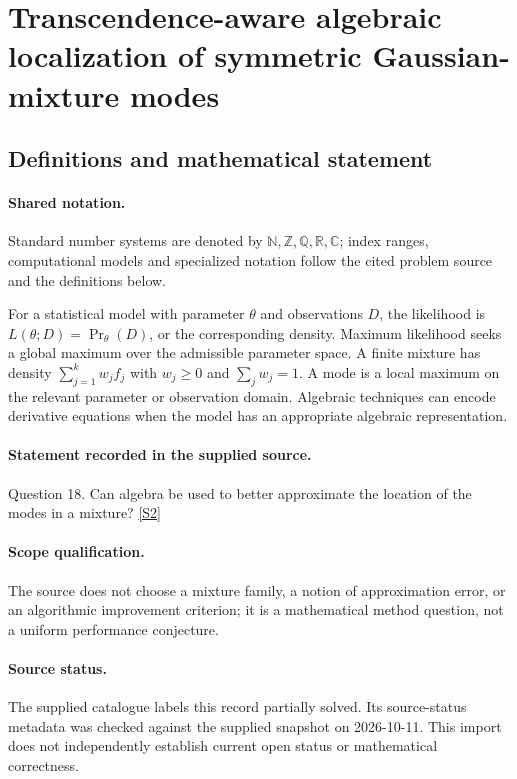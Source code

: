 \documentclass[11pt]{article}
\newcommand{\sref}[2]{\hyperlink{source:#1:#2}{[S#2]}}
\begin{document}
\section{Transcendence-aware algebraic localization of symmetric Gaussian-mixture modes}\label{statement}

\subsection{Definitions and mathematical statement}

\paragraph{Shared notation.}Standard number systems are denoted by $\mathbb N,\mathbb Z,\mathbb Q,\mathbb R,\mathbb C$; index ranges, computational models and specialized notation follow the cited problem source and the definitions below.


For a statistical model with parameter $\theta$ and observations $D$, the likelihood is $L(\theta;D)=\Pr_\theta(D)$, or the corresponding density. Maximum likelihood seeks a global maximum over the admissible parameter space. A finite mixture has density $\sum_{j=1}^k w_j f_j$ with $w_j\ge0$ and $\sum_j w_j=1$. A mode is a local maximum on the relevant parameter or observation domain. Algebraic techniques can encode derivative equations when the model has an appropriate algebraic representation.
\paragraph{Statement recorded in the supplied source.}
Question 18. Can algebra be used to better approximate the location of the modes in a mixture? \sref{statement}{2}
\paragraph{Scope qualification.}
The source does not choose a mixture family, a notion of approximation error, or an algorithmic improvement criterion; it is a mathematical method question, not a uniform performance conjecture.
\paragraph{Source status.}
The supplied catalogue labels this record partially solved. Its source-status metadata was checked against the supplied snapshot on 2026-10-11. This import does not independently establish current open status or mathematical correctness.
\end{document}
